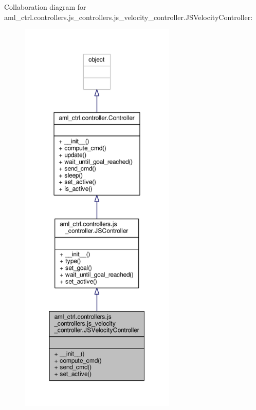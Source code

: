 Collaboration diagram for aml\-\_\-ctrl.\-controllers.\-js\-\_\-controllers.\-js\-\_\-velocity\-\_\-controller.\-J\-S\-Velocity\-Controller\-:
\nopagebreak
\begin{figure}[H]
\begin{center}
\leavevmode
\includegraphics[height=550pt]{classaml__ctrl_1_1controllers_1_1js__controllers_1_1js__velocity__controller_1_1_j_s_velocity_controller__coll__graph}
\end{center}
\end{figure}
